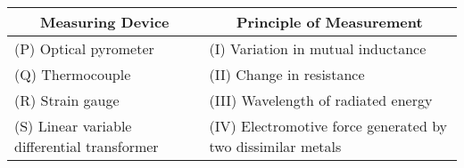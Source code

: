 \begin{tabular}{|l|l|}

\hline

\multicolumn{1}{|c|}{Measuring Device} &
\multicolumn{1}{|c|}{Principle of Measurement}\\

\hline

(P) Optical pyrometer & (I) Variation in mutual inductance\\

\hline

(Q) Thermocouple & (II) Change in resistance\\

\hline

(R) Strain gauge & (III) Wavelength of radiated energy\\

\hline

(S) Linear variable differential transformer & (IV) Electromotive force generated by two dissimilar metals \\

\hline

\end{tabular}

